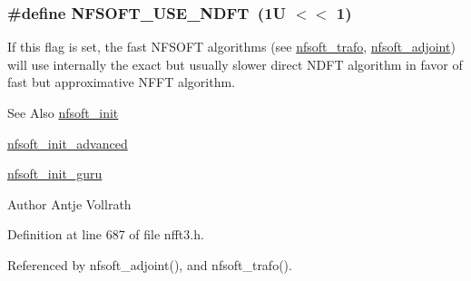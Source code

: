 \hypertarget{group__nfsoft_ga14cae92f8ee539b4a41aebdf913ef2c5}{
\subsubsection[{N\-F\-S\-O\-F\-T\-\_\-\-U\-S\-E\-\_\-\-N\-D\-F\-T}]{\setlength{\rightskip}{0pt plus 5cm}\#define N\-F\-S\-O\-F\-T\-\_\-\-U\-S\-E\-\_\-\-N\-D\-F\-T~(1\-U $<$$<$ 1)}}\label{group__nfsoft_ga14cae92f8ee539b4a41aebdf913ef2c5}
If this flag is set, the fast N\-F\-S\-O\-F\-T algorithms (see \hyperlink{group__nfsoft_gae243cd75d7571a99eae53818e32355fb}{nfsoft\-\_\-trafo}, \hyperlink{group__nfsoft_ga08395b1dd90f9a2565685d17460afc5b}{nfsoft\-\_\-adjoint}) will use internally the exact but usually slower direct N\-D\-F\-T algorithm in favor of fast but approximative N\-F\-F\-T algorithm.

\begin{DoxySeeAlso}{See Also}
\hyperlink{group__nfsoft_ga31c884458165fa204073c6c16c10775e}{nfsoft\-\_\-init} 

\hyperlink{group__nfsoft_gaf4aec4ee2a2a5d56ca27c4f1a7f90b18}{nfsoft\-\_\-init\-\_\-advanced} 

\hyperlink{group__nfsoft_ga1c13cdd3f82f48fa41acdd313cdc2052}{nfsoft\-\_\-init\-\_\-guru} 
\end{DoxySeeAlso}
\begin{DoxyAuthor}{Author}
Antje Vollrath 
\end{DoxyAuthor}


Definition at line 687 of file nfft3.\-h.



Referenced by nfsoft\-\_\-adjoint(), and nfsoft\-\_\-trafo().

